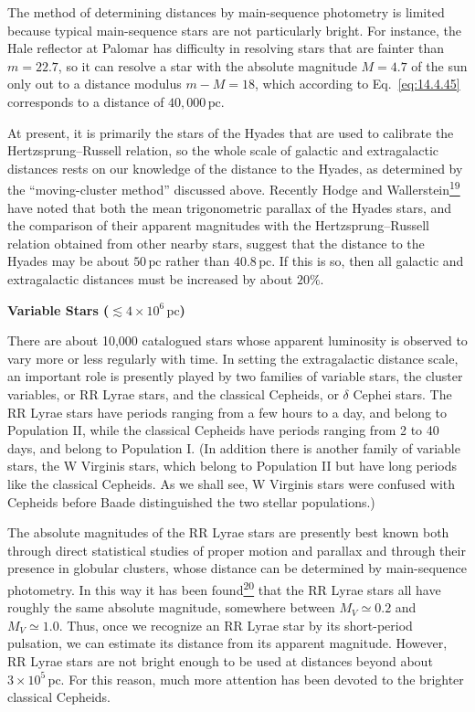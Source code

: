 



The method of determining distances by main-sequence photometry is limited
because typical main-sequence stars are not particularly bright. For
instance, the Hale reflector at Palomar has difficulty in resolving stars
that are fainter than \(m=22.7\), so it can resolve a star with the absolute
magnitude \(M=4.7\) of the sun only out to a distance modulus \(m-M=18\),
which according to Eq.~\eqref{eq:14.4.45} corresponds to a distance of
\(40{,}000\,\mathrm{pc}\).

At present, it is primarily the stars of the Hyades that are used to
calibrate the Hertzsprung--Russell relation, so the whole scale of galactic
and extragalactic distances rests on our knowledge of the distance to the
Hyades, as determined by the ``moving-cluster method'' discussed above.
Recently Hodge and Wallerstein\hyperref[ch14-ref-19]{\textsuperscript{19}}
have noted that both the mean trigonometric parallax of the Hyades stars,
and the comparison of their apparent magnitudes with the
Hertzsprung--Russell relation obtained from other nearby stars, suggest that
the distance to the Hyades may be about \(50\,\mathrm{pc}\) rather than
\(40.8\,\mathrm{pc}\). If this is so, then all galactic and extragalactic
distances must be increased by about \(20\%\).

\medskip
\noindent\textbf{Variable Stars (\(\lesssim4\times10^6\,\mathrm{pc}\))}
\par\smallskip

There are about 10,000 catalogued stars whose apparent luminosity is observed
to vary more or less regularly with time. In setting the extragalactic
distance scale, an important role is presently played by two families of
variable stars, the cluster variables, or RR Lyrae stars, and the classical
Cepheids, or \(\delta\) Cephei stars. The RR Lyrae stars have periods ranging
from a few hours to a day, and belong to Population II, while the classical
Cepheids have periods ranging from 2 to 40 days, and belong to Population I.
(In addition there is another family of variable stars, the W Virginis
stars, which belong to Population II but have long periods like the
classical Cepheids. As we shall see, W Virginis stars were confused with
Cepheids before Baade distinguished the two stellar populations.)

The absolute magnitudes of the RR Lyrae stars are presently best known both
through direct statistical studies of proper motion and parallax and through
their presence in globular clusters, whose distance can be determined by
main-sequence photometry. In this way it has been
found\hyperref[ch14-ref-20]{\textsuperscript{20}} that the RR Lyrae stars all
have roughly the same absolute magnitude, somewhere between \(M_V\simeq0.2\)
and \(M_V\simeq1.0\). Thus, once we recognize an RR Lyrae star by its
short-period pulsation, we can estimate its distance from its apparent
magnitude. However, RR Lyrae stars are not bright enough to be used at
distances beyond about \(3\times10^5\,\mathrm{pc}\). For this reason, much
more attention has been devoted to the brighter classical Cepheids.

